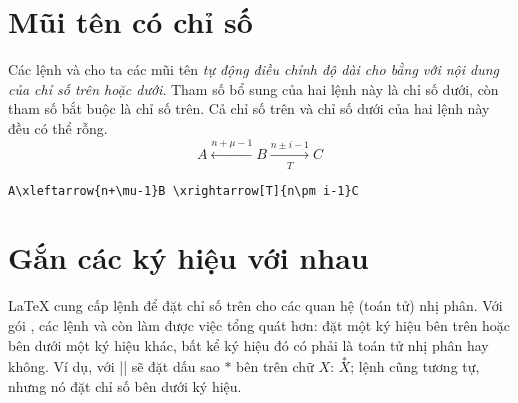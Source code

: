 \section{Mũi tên có chỉ số}

Các lệnh  và  cho ta các mũi tên \emph{tự động
điều chỉnh độ dài cho bằng với nội dung của chỉ số trên hoặc dưới}.
Tham số bổ sung của hai lệnh này là chỉ số dưới, còn tham số bắt buộc
là chỉ số trên. Cả chỉ số trên và chỉ số dưới của hai lệnh này đều có thể rỗng.
\begin{equation}
A\xleftarrow{n+\mu-1}B \xrightarrow[T]{n\pm i-1}C
\end{equation}
\begin{verbatim}
A\xleftarrow{n+\mu-1}B \xrightarrow[T]{n\pm i-1}C
\end{verbatim}


\section{Gắn các ký hiệu với nhau}

\LaTeX{} cung cấp lệnh  để đặt chỉ số trên cho các quan hệ (toán tử)
nhị phân. Với gói , các lệnh  và 
còn làm được việc tổng quát hơn: đặt một ký hiệu bên trên hoặc bên dưới
một ký hiệu khác, bất kể ký hiệu đó có phải là toán tử nhị phân hay không.
Ví dụ, với || sẽ đặt dấu sao $*$ bên trên chữ $X$:
$\overset{*}{X}$; lệnh  cũng tương tự, nhưng nó đặt chỉ số
bên dưới ký hiệu.

